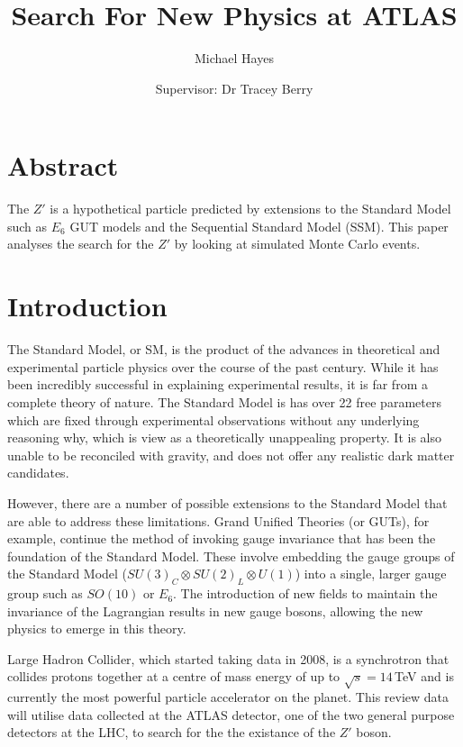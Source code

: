 \documentclass{article}
\title{Search For New Physics at ATLAS}
\author{Michael Hayes}
\date{Supervisor: Dr Tracey Berry}
\begin{document}
\maketitle
\large
\onehalfspacing
\section*{Abstract}
\addtocounter{section}{1}
The $Z'$ is a hypothetical particle predicted by extensions to the Standard Model such as $E_6$ GUT models and the Sequential Standard Model (SSM). This paper analyses the search for the $Z'$ by looking at simulated Monte Carlo events.

\clearpage
\normalsize
\tableofcontents
\clearpage
\large
\section{Introduction}%
\label{sec:Introduction}
The Standard Model, or SM, is the product of the advances in theoretical and experimental particle physics over the course of the past century. While it has been incredibly successful in explaining experimental results, it is far from a complete theory of nature. The Standard Model is has over 22 free parameters which are fixed through experimental observations without any underlying reasoning why, which is view as a theoretically unappealing property. It is also unable to be reconciled with gravity, and does not offer any realistic dark matter candidates. 

However, there are a number of possible extensions to the Standard Model that are able to address these limitations. Grand Unified Theories (or GUTs), for example, continue the method of invoking gauge invariance that has been the foundation of the Standard Model. These involve embedding the gauge groups of the Standard Model ($SU(3)_C \otimes SU(2)_L \otimes U(1)$) into a single, larger gauge group such as $SO(10)$ or $E_6$. The introduction of new fields to maintain the invariance of the Lagrangian results in new gauge bosons, allowing the new physics to emerge in this theory.

Large Hadron Collider, which started taking data in 2008, is a synchrotron that collides protons together at a centre of mass energy of up to $\sqrt{s} = 14\,$TeV and is currently the most powerful particle accelerator on the planet. This review data will utilise data collected at the ATLAS detector, one of the two general purpose detectors at the LHC, to search for the the existance of the $Z'$ boson.
\end{document}
